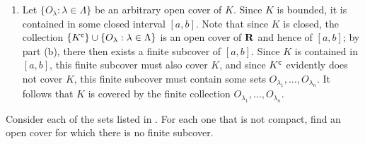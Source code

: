 \documentclass{lew98_solutions}
\begin{document}
\begin{solution}
\begin{enumerate}
        \item Let \( \{ O_{\lambda} : \lambda \in \Lambda \} \) be an arbitrary open cover of \( K \). Since \( K \) is bounded, it is contained in some closed interval \( [a, b] \). Note that since \( K \) is closed, the collection \( \{ K^{\mathsf{c}} \} \cup \{ O_{\lambda} : \lambda \in \Lambda \} \) is an open cover of \( \mathbf{R} \) and hence of \( [a, b] \); by part (b), there then exists a finite subcover of \( [a, b] \). Since \( K \) is contained in \( [a, b] \), this finite subcover must also cover \( K \), and since \( K^{\mathsf{c}} \) evidently does not cover \( K \), this finite subcover must contain some sets \( O_{\lambda_1}, \ldots, O_{\lambda_n} \). It follows that \( K \) is covered by the finite collection \( O_{\lambda_1}, \ldots, O_{\lambda_n} \).
    \end{enumerate}
\end{solution}

\begin{exercise}
\label{ex:3.3.11}
    Consider each of the sets listed in . For each one that is not compact, find an open cover for which there is no finite subcover.
\end{exercise}
\end{document}
